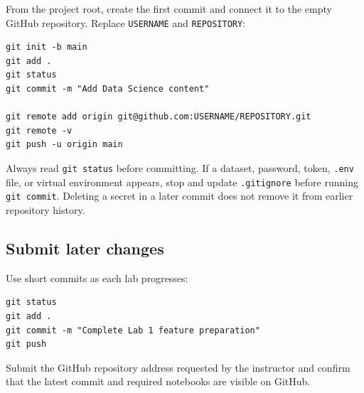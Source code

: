 From the project root, create the first commit and connect it to the empty
GitHub repository. Replace \texttt{USERNAME} and \texttt{REPOSITORY}:

\begin{lstlisting}[style=mlterminal]
git init -b main
git add .
git status
git commit -m "Add Data Science content"

git remote add origin git@github.com:USERNAME/REPOSITORY.git
git remote -v
git push -u origin main
\end{lstlisting}

\begin{pitfall}
Always read \texttt{git status} before committing. If a dataset, password,
token, \texttt{.env} file, or virtual environment appears, stop and update
\texttt{.gitignore} before running \texttt{git commit}. Deleting a secret in a
later commit does not remove it from earlier repository history.
\end{pitfall}

\subsection{Submit later changes}

Use short commits as each lab progresses:

\begin{lstlisting}[style=mlterminal]
git status
git add .
git commit -m "Complete Lab 1 feature preparation"
git push
\end{lstlisting}

Submit the GitHub repository address requested by the instructor and confirm that the latest commit and required notebooks are visible on GitHub.
